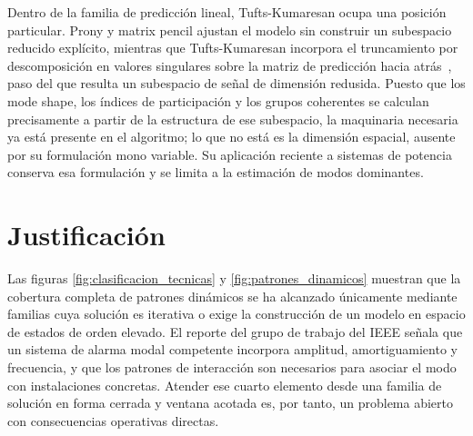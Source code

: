 Dentro de la familia de predicción lineal, Tufts-Kumaresan ocupa una posición particular. Prony y matrix pencil ajustan 
el modelo sin construir un subespacio reducido explícito, mientras que Tufts-Kumaresan incorpora el truncamiento por 
descomposición en valores singulares sobre la matriz de predicción hacia atrás~\cite{Tufts1982}, paso del que resulta 
un subespacio de señal de dimensión redusida. Puesto que los mode shape, los índices de participación y los grupos 
coherentes se calculan precisamente a partir de la estructura de ese subespacio, la maquinaria necesaria ya está 
presente en el algoritmo; lo que no está es la dimensión espacial, ausente por su formulación mono variable. Su 
aplicación reciente a sistemas de potencia~\cite{Moghdam2024} conserva esa formulación y se limita a la estimación de 
modos dominantes.



\section{Justificación}

Las figuras \ref{fig:clasificacion_tecnicas} y \ref{fig:patrones_dinamicos} muestran que la cobertura completa de patrones 
dinámicos se ha alcanzado únicamente mediante familias cuya solución es iterativa o exige la construcción de un modelo en 
espacio de estados de orden elevado. El reporte del grupo de trabajo del IEEE señala que un sistema de alarma modal 
competente incorpora amplitud, amortiguamiento y frecuencia, y que los patrones de interacción son necesarios para asociar 
el modo con instalaciones concretas\cite[Cap. 4]{ieee2012}. Atender ese cuarto elemento desde una familia de solución en 
forma cerrada y ventana acotada es, por tanto, un problema abierto con consecuencias operativas directas.

